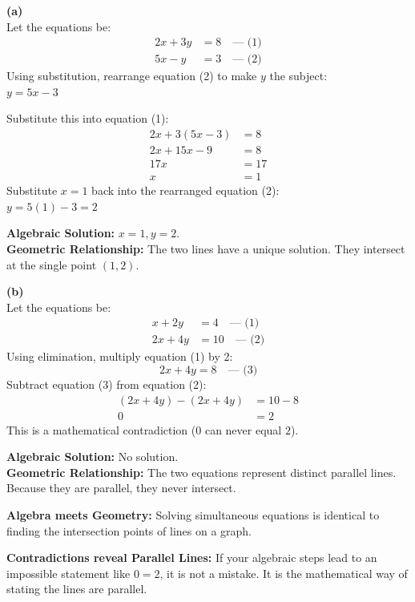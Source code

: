 \begin{solution}
\textbf{(a)} \\
Let the equations be:
\begin{align*}
2x + 3y &= 8 \quad \text{--- (1)} \\
5x - y &= 3 \quad \text{--- (2)}
\end{align*}
Using substitution, rearrange equation (2) to make $y$ the subject: \\
$y = 5x - 3$

Substitute this into equation (1):
\begin{align*}
2x + 3(5x - 3) &= 8 \\
2x + 15x - 9 &= 8 \\
17x &= 17 \\
x &= 1
\end{align*}
Substitute $x = 1$ back into the rearranged equation (2): \\
$y = 5(1) - 3 = 2$

\textbf{Algebraic Solution:} $x = 1, y = 2$. \\
\textbf{Geometric Relationship:} The two lines have a unique solution. They intersect at the single point $(1, 2)$.

\medskip
\textbf{(b)} \\
Let the equations be:
\begin{align*}
x + 2y &= 4 \quad \text{--- (1)} \\
2x + 4y &= 10 \quad \text{--- (2)}
\end{align*}
Using elimination, multiply equation (1) by 2:
\[
2x + 4y = 8 \quad \text{--- (3)}
\]
Subtract equation (3) from equation (2):
\begin{align*}
(2x + 4y) - (2x + 4y) &= 10 - 8 \\
0 &= 2
\end{align*}
This is a mathematical contradiction ($0$ can never equal $2$).

\textbf{Algebraic Solution:} No solution. \\
\textbf{Geometric Relationship:} The two equations represent distinct parallel lines. Because they are parallel, they never intersect.
\end{solution}

\begin{takeaways}
\item \textbf{Algebra meets Geometry:} Solving simultaneous equations is identical to finding the intersection points of lines on a graph.
\item \textbf{Contradictions reveal Parallel Lines:} If your algebraic steps lead to an impossible statement like $0 = 2$, it is not a mistake. It is the mathematical way of stating the lines are parallel.
\end{takeaways}
